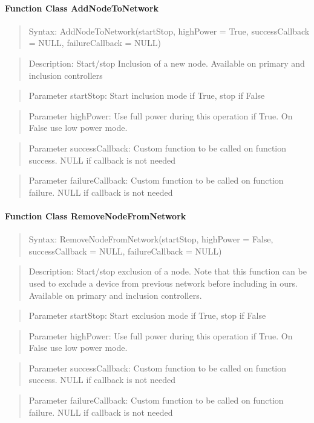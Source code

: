 \paragraph {Function Class AddNodeToNetwork}
\begin{quote} Syntax: AddNodeToNetwork(startStop, highPower = True, successCallback = NULL, failureCallback = NULL)\end{quote}
\begin{quote} Description: Start/stop Inclusion of a new node. Available on primary and inclusion controllers\end{quote}
\begin{quote} Parameter startStop: Start inclusion mode if True, stop if False\end{quote}
\begin{quote} Parameter highPower: Use full power during this operation if True. On False use low power mode.\end{quote}
\begin{quote} Parameter successCallback: Custom function to be called on function success. NULL if callback is not needed\end{quote} 
\begin{quote} Parameter failureCallback: Custom function to be called on function failure. NULL if callback is not needed\end{quote} 

\paragraph {Function Class RemoveNodeFromNetwork}
\begin{quote} Syntax: RemoveNodeFromNetwork(startStop, highPower = False, successCallback = NULL, failureCallback = NULL)\end{quote}
\begin{quote} Description: Start/stop exclusion of a node. Note that this function can be used to exclude a device from previous network 
before including in ours. Available on primary and inclusion controllers.\end{quote}
\begin{quote} Parameter startStop: Start exclusion mode if True, stop if False\end{quote}
\begin{quote} Parameter highPower: Use full power during this operation if True. On False use low power mode.\end{quote}
\begin{quote} Parameter successCallback: Custom function to be called on function success. NULL if callback is not needed\end{quote} 
\begin{quote} Parameter failureCallback: Custom function to be called on function failure. NULL if callback is not needed\end{quote} 

